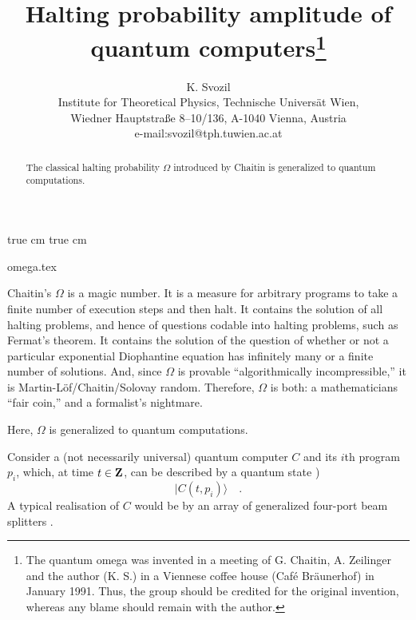  true cm
 true cm


\title{{Halting probability amplitude of quantum computers}\thanks{The
quantum omega was invented in a meeting of G. Chaitin,
A. Zeilinger and the author (K. S.) in a Viennese coffee house
(Caf\'{e} Br\"aunerhof) in January 1991.
Thus, the group should be credited for the original invention,
whereas any blame should remain with the author.}
}
\author{ K. Svozil\\
Institute for Theoretical Physics, Technische Univers\"at Wien,\\
 Wiedner Hauptstra\ss e 8--10/136, A-1040 Vienna, Austria\\
e-mail:svozil@tph.tuwien.ac.at
}

\maketitle

\begin{abstract}
The classical halting
probability
$\Omega$ introduced by Chaitin is generalized to quantum
computations.
 \end{abstract}
\begin{flushright}
{\scriptsize omega.tex}
\end{flushright}

Chaitin's $\Omega$ \cite{chaitin,solovay,calude} is a magic
number.
It is a measure for arbitrary programs to take a finite number of
execution steps and
then halt.
It contains the solution of all halting problems, and hence of
questions codable into halting problems, such as Fermat's theorem.
It contains the solution of the question of whether or not a particular
exponential Diophantine equation
has infinitely many or a finite number of solutions.
And, since $\Omega$ is provable ``algorithmically incompressible,'' it
is Martin-L\"of/Chaitin/Solovay random. Therefore, $\Omega$ is both: a
mathematicians ``fair coin,''  and a formalist's nightmare.

Here, $\Omega$ is generalized to quantum computations.

 Consider a (not necessarily universal) quantum computer $C$ and its
$i$th
 program $p_i$,
 which, at time $t\in {\bf Z}$, can be described by a quantum state
\cite{a:8,be,deutsch-85,f-85,peres-85,b-86,m-86,deutsch:89,deutsch:92})
\begin{equation}
\vert C(t, p_i)\rangle
\quad .
\label{e:om1}
\end{equation}
A typical realisation of $C$ would be by an array of
generalized four-port beam splitters \cite{zeilinger}.

